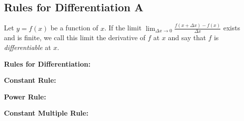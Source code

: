 \documentclass[addpoints, 12pt]{exam}
\begin{document}
\newpage
{}
\subsection*{Rules for Differentiation A}

Let $y=f(x)$ be a function of $x$. If the limit $\displaystyle\lim_{\Delta x\to0}\frac{f(x+\Delta x)-f(x)}{\Delta x}$ exists and is finite, we call this limit the derivative of $f$ at $x$ and say that $f$ is \textit{differentiable} at $x$.

\noindent\textbf{Rules for Differentiation:}
\begin{questions}
    \question \textbf{Constant Rule:}
    
    \question \textbf{Power Rule:}
    
    \question \textbf{Constant Multiple Rule:}
\end{questions}
\end{document}
